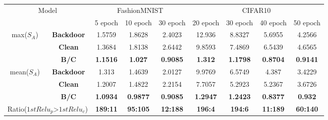 \documentclass[12pt]{report}
\begin{document}
\begin{table*}[t]
\begin{tabular}{|c|c|c|c|c|c|c|c|c|}
    \multicolumn{2}{|c|}{\multirow{2}{*}{Model}} & \multicolumn{3}{c|}{FashionMNIST}&\multicolumn{4}{c|}{CIFAR10}\\
    \cline{3-9}
    
    \multicolumn{2}{|c|}{} & 5 epoch & 10 epoch & 30 epoch & 20 epoch & 30 epoch & 40 epoch & 50 epoch \\
    \hline


    \multirow{3}{*}{max($S_A$)} & \textbf{Backdoor} &1.5759 &1.8628 &2.4023 &12.936 &8.8327 &5.6955 &4.2566 \\
    \cline{2-9}
    
    \multirow{3}{*}{} & \textbf{Clean} &1.3684 &1.8138 &2.6442 &9.8593 &7.4869 &6.5439	&4.6565\\
    \cline{2-9}
    
    \multirow{3}{*}{} & \textbf{B/C} &\textbf{1.1516} &\textbf{1.027} &\textbf{0.9085} &\textbf{1.312} &\textbf{1.1798}	&\textbf{0.8704}&\textbf{0.9141} \\
    \hline

    \multirow{3}{*}{mean($S_A$)} & \textbf{Backdoor} &1.313 &1.4639 &2.0127 &9.9769 &6.5749 &4.387 &3.4229 \\
    \cline{2-9}
    
    \multirow{3}{*}{} & \textbf{Clean} &1.2007	&1.4822 &2.2154 &7.7057 &5.2923	&5.2367 &3.6726\\
    \cline{2-9}
    
    \multirow{3}{*}{} & \textbf{B/C} &\textbf{1.0934} &\textbf{0.9877} &\textbf{0.9085} &\textbf{1.2947} &\textbf{1.2423}	&\textbf{0.8377} &\textbf{0.932} \\
    \hline

    \multicolumn{2}{|c|}{Ratio($1stRelu_p$\textgreater $1stRelu_c$)} &\textbf{189:11}    &\textbf{95:105}	&\textbf{12:188}	&\textbf{196:4}	&\textbf{194:6}	&\textbf{11:189}	&\textbf{60:140}\\ 
    \hline
    
    \end{tabular}
    \end{table*}






\end{document}
